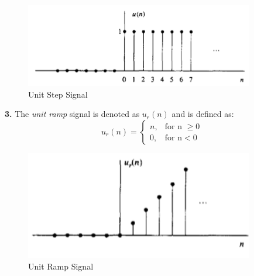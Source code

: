 \documentclass{article} %
\begin{document}
    \begin{figure}[h]
    \centering
	\includegraphics[width=10cm]{step}
	\caption{Unit Step Signal}
	\end{figure}
	
	\textbf{3.} The \textit{unit ramp} signal is denoted as $u_r(n)$ and is defined as:
	\begin{equation}
 	 u_r(n) =
    	\begin{cases}
      	n, & \text{for n } \ge { 0}\\
      	0, & \text{for n} <{ 0}
    	\end{cases}       
	\end{equation}
    
    \begin{figure}[h]
    \centering
	\includegraphics[width=10cm]{ramp}
	\caption{Unit Ramp Signal}
	\end{figure}
	
\end{document}

